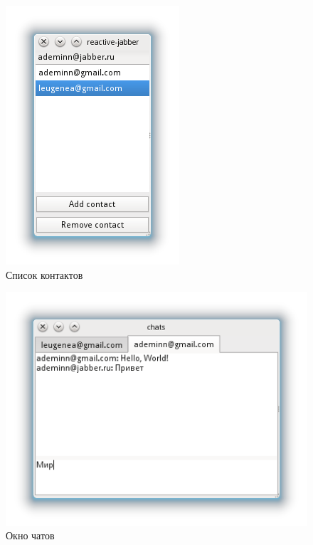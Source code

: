 \begin{figure}[p]
\centering
\includegraphics{pic/main.png}
\caption{Список контактов}
\label{pic:main}
\end{figure}

\begin{figure}[p]
\centering
\includegraphics{pic/chats.png}
\caption{Окно чатов}
\label{pic:chats}
\end{figure}
\clearpage
